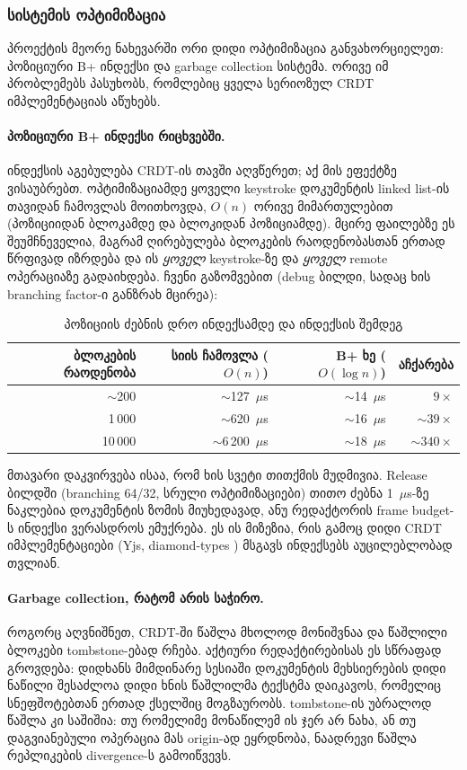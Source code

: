 \subsubsection{სისტემის ოპტიმიზაცია}

პროექტის მეორე ნახევარში ორი დიდი ოპტიმიზაცია განვახორციელეთ: პოზიციური
B+ ინდექსი და garbage collection სისტემა. ორივე იმ პრობლემებს პასუხობს,
რომლებიც ყველა სერიოზულ CRDT იმპლემენტაციას აწუხებს.

\paragraph{პოზიციური B+ ინდექსი რიცხვებში.}
ინდექსის აგებულება CRDT-ის თავში აღვწერეთ; აქ მის ეფექტზე ვისაუბრებთ.
ოპტიმიზაციამდე ყოველი keystroke დოკუმენტის linked list-ის თავიდან
ჩამოვლას მოითხოვდა, $O(n)$ ორივე მიმართულებით (პოზიციიდან ბლოკამდე და
ბლოკიდან პოზიციამდე). მცირე ფაილებზე ეს შეუმჩნეველია, მაგრამ ღირებულება
ბლოკების რაოდენობასთან ერთად წრფივად იზრდება და ის \emph{ყოველ}
keystroke-ზე და \emph{ყოველ} remote ოპერაციაზე გადაიხდება.
ჩვენი გაზომვებით (debug ბილდი, სადაც ხის branching factor-ი განზრახ
მცირეა):

\begin{table}[htbp]
  \centering
  \begin{tabular}{rrrr}
    \toprule
    ბლოკების რაოდენობა & სიის ჩამოვლა ($O(n)$) & B+ ხე ($O(\log n)$) & აჩქარება \\
    \midrule
    $\sim$200    & $\sim$127~$\mu$s  & $\sim$14~$\mu$s & $9\times$ \\
    1\,000       & $\sim$620~$\mu$s  & $\sim$16~$\mu$s & $\sim 39\times$ \\
    10\,000      & $\sim$6\,200~$\mu$s & $\sim$18~$\mu$s & $\sim 340\times$ \\
    \bottomrule
  \end{tabular}
  \caption{პოზიციის ძებნის დრო ინდექსამდე და ინდექსის შემდეგ}
  \label{tab:btree}
\end{table}

მთავარი დაკვირვება ისაა, რომ ხის სვეტი თითქმის მუდმივია.
Release ბილდში (branching 64/32, სრული ოპტიმიზაციები) თითო ძებნა
1~$\mu$s-ზე ნაკლებია დოკუმენტის ზომის მიუხედავად, ანუ რედაქტორის frame
budget-ს ინდექსი ვერასდროს ემუქრება. ეს ის მიზეზია, რის გამოც დიდი CRDT
იმპლემენტაციები (Yjs, diamond-types \cite{diamond}) მსგავს ინდექსებს
აუცილებლობად თვლიან.

\paragraph{Garbage collection, რატომ არის საჭირო.}
როგორც აღვნიშნეთ, CRDT-ში წაშლა მხოლოდ მონიშვნაა და წაშლილი ბლოკები
tombstone-ებად რჩება. აქტიური რედაქტირებისას ეს სწრაფად გროვდება:
დიდხანს მიმდინარე სესიაში დოკუმენტის მეხსიერების დიდი ნაწილი შესაძლოა
დიდი ხნის წაშლილმა ტექსტმა დაიკავოს, რომელიც სნეფშოტებთან ერთად
ქსელშიც მოგზაურობს. tombstone-ის უბრალოდ წაშლა კი საშიშია: თუ რომელიმე
მონაწილემ ის ჯერ არ ნახა, ან თუ დაგვიანებული ოპერაცია მას origin-ად
ეყრდნობა, ნაადრევი წაშლა რეპლიკების divergence-ს გამოიწვევს.

